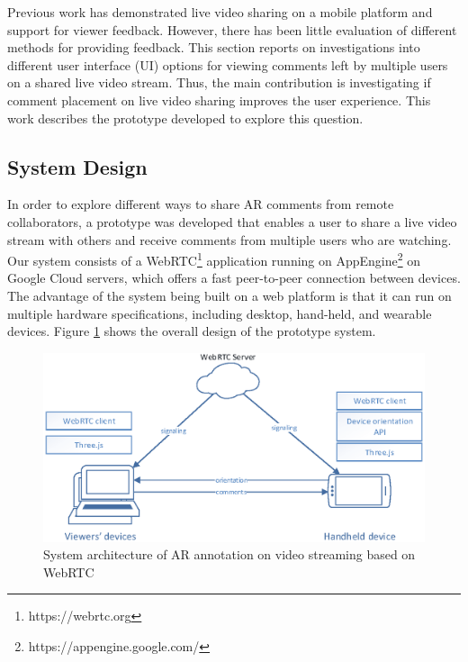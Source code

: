 Previous work has demonstrated live video sharing on a mobile platform and support for viewer feedback. However, there has been little evaluation of different methods for providing feedback. This section reports on investigations into different user interface (UI) options for viewing comments left by multiple users on a shared live video stream. Thus, the main contribution is investigating if comment placement on live video sharing improves the user experience. This work describes the prototype developed to explore this question.

\subsection{System Design}

In order to explore different ways to share AR comments from remote collaborators, a prototype was developed that enables a user to share a live video stream with others and receive comments from multiple users who are watching. Our system consists of a WebRTC\footnote{https://webrtc.org} application running on AppEngine\footnote{https://appengine.google.com/} on Google Cloud servers, which offers a fast peer-to-peer connection between devices. The advantage of the system being built on a web platform is that it can run on multiple hardware specifications, including desktop, hand-held, and wearable devices. Figure \ref{fig:mgia16:system} shows the overall design of the prototype system.

\begin{figure}[ht]
  \centering
  \includegraphics[width=\linewidth]{images/mgia16/system}
  \caption{System architecture of AR annotation on video streaming based on WebRTC}
    \label{fig:mgia16:system}
\end{figure}

